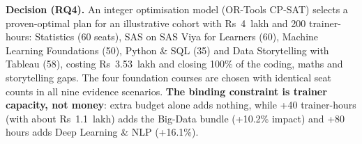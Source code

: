 \textbf{Decision (RQ4).} An integer optimisation model (OR-Tools CP-SAT) selects a proven-optimal
plan for an illustrative cohort with Rs~4~lakh and 200 trainer-hours: Statistics (60 seats), SAS on
SAS Viya for Learners (60), Machine Learning Foundations (50), Python \& SQL (35) and Data
Storytelling with Tableau (58), costing Rs~3.53~lakh and closing 100\% of the coding, maths and
storytelling gaps. The four foundation courses are chosen with identical seat counts in all nine
evidence scenarios. \textbf{The binding constraint is trainer capacity, not money}: extra budget
alone adds nothing, while +40 trainer-hours (with about Rs~1.1~lakh) adds the Big-Data bundle
(+10.2\% impact) and +80 hours adds Deep Learning \& NLP (+16.1\%).

\clearpage
